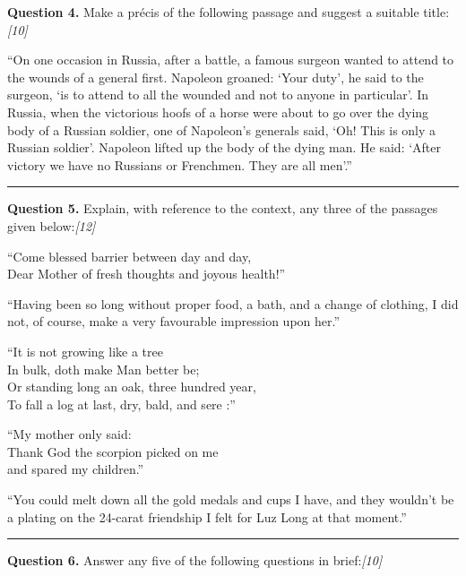 \documentclass[11pt,a4paper]{article}
\newcommand{\pts}[1]{\hfill   \textit{[#1]}}
\begin{document}
\noindent   \textbf{Question 4.}
Make a précis of the following passage and suggest a suitable title:\pts{10}

``On one occasion in Russia, after a battle, a famous surgeon wanted to attend to the wounds of a general first. Napoleon groaned: `Your duty', he said to the surgeon, `is to attend to all the wounded and not to anyone in particular'. In Russia, when the victorious hoofs of a horse were about to go over the dying body of a Russian soldier, one of Napoleon's generals said, `Oh! This is only a Russian soldier'. Napoleon lifted up the body of the dying man. He said: `After victory we have no Russians or Frenchmen. They are all men'.''

\medskip\rule{\linewidth}{0.2pt}




\noindent   \textbf{Question 5.}
Explain, with reference to the context, any three of the passages given below:\pts{12}

\begin{parts}
  \item ``Come blessed barrier between day and day, \\ Dear Mother of fresh thoughts and joyous health!''
  \item ``Having been so long without proper food, a bath, and a change of clothing, I did not, of course, make a very favourable impression upon her.''
  \item ``It is not growing like a tree \\ In bulk, doth make Man better be; \\ Or standing long an oak, three hundred year, \\ To fall a log at last, dry, bald, and sere :''
  \item ``My mother only said: \\ Thank God the scorpion picked on me \\ and spared my children.''
  \item ``You could melt down all the gold medals and cups I have, and they wouldn't be a plating on the 24-carat friendship I felt for Luz Long at that moment.''
\end{parts}

\medskip\rule{\linewidth}{0.2pt}




\noindent   \textbf{Question 6.}
Answer any five of the following questions in brief:\pts{10}
\end{document}
